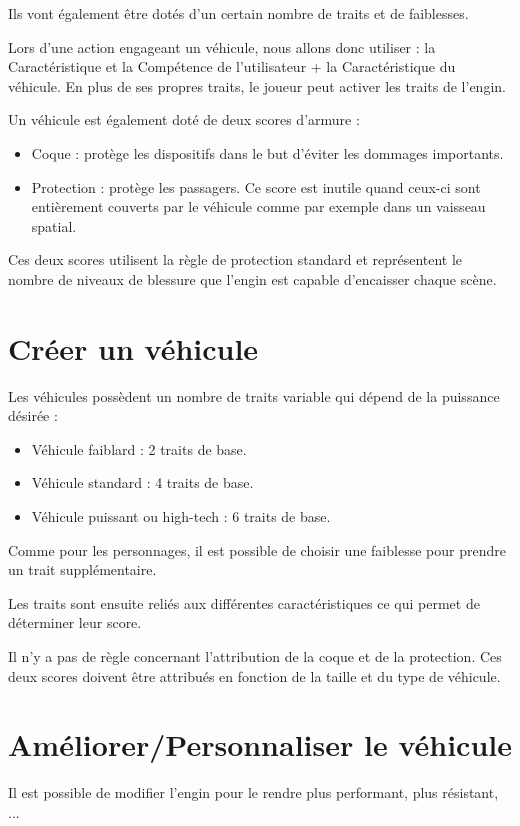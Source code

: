 \documentclass{conf/FusinaClass}
\begin{document}
Ils vont également être dotés d'un certain nombre de traits et de faiblesses.

Lors d'une action engageant un véhicule, nous allons donc utiliser : la Caractéristique et la Compétence de l'utilisateur + la Caractéristique du véhicule. En plus de ses propres traits, le joueur peut activer les traits de l'engin.

Un véhicule est également doté de deux scores d'armure :

\begin{itemize}
\item Coque : protège les dispositifs dans le but d'éviter les dommages importants.
\item Protection : protège les passagers. Ce score est inutile quand ceux-ci sont entièrement couverts par le véhicule comme par exemple dans un vaisseau spatial.
\end{itemize}

Ces deux scores utilisent la règle de protection standard et représentent le nombre de niveaux de blessure que l'engin est capable d'encaisser chaque scène.

\section{Créer un véhicule}
Les véhicules possèdent un nombre de traits variable qui dépend de la puissance désirée :

\begin{itemize}
\item Véhicule faiblard : 2 traits de base.
\item Véhicule standard : 4 traits de base.
\item Véhicule puissant ou high-tech : 6 traits de base.
\end{itemize}

Comme pour les personnages, il est possible de choisir une faiblesse pour prendre un trait supplémentaire. 

Les traits sont ensuite reliés aux différentes caractéristiques ce qui permet de déterminer leur score.

Il n'y a pas de règle concernant l'attribution de la coque et de la protection. Ces deux scores doivent être attribués en fonction de la taille et du type de véhicule.

\section{Améliorer/Personnaliser le véhicule}
Il est possible de modifier l'engin pour le rendre plus performant, plus résistant, ... 
\end{document}
